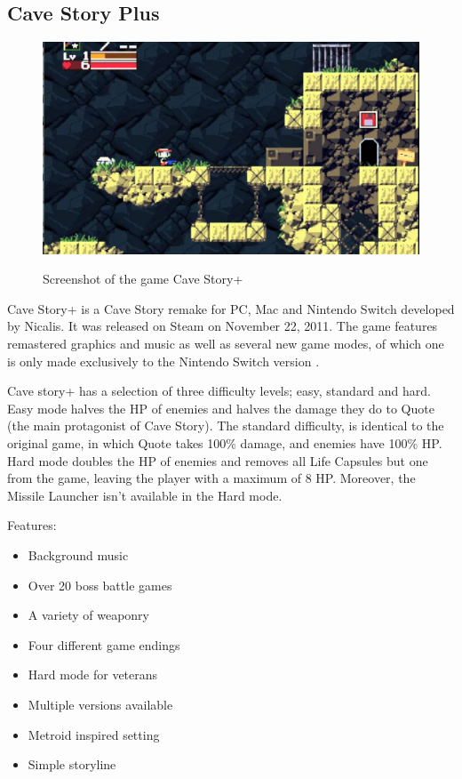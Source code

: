 \documentclass[12p]{article}
\begin{document}

\subsection{Cave Story Plus}

\begin{figure}[ht]
    \center
    \includegraphics[width=1\textwidth]{StateOfTheArtScreenshots/cave_story_plus}
    \label{StateOfTheArt_Screenshots_CaveStoryPlus}
    \caption{Screenshot of the game Cave Story+ \cite{CaveStoryPlusScreenshot}}
\end{figure}

Cave Story+ is a Cave Story remake for PC, Mac and Nintendo Switch developed by Nicalis. It was released on Steam on November 22, 2011. The game features remastered graphics and music as well as several new game modes, of which one is only made exclusively to the Nintendo Switch version \cite{CaveStoryPlusWiki}.

Cave story+ has a selection of three difficulty levels; easy, standard and hard. Easy mode halves the HP of enemies and halves the damage they do to Quote (the main protagonist of Cave Story). The standard difficulty, is identical to the original game, in which Quote takes 100\% damage, and enemies have 100\% HP. Hard mode doubles the HP of enemies and removes all Life Capsules but one from the game, leaving the player with a maximum of 8 HP. Moreover, the Missile Launcher isn't available in the Hard mode.

Features:

\begin{itemize}
    \item Background music
    \item Over 20 boss battle games
    \item A variety of weaponry
    \item Four different game endings
    \item Hard mode for veterans
    \item Multiple versions available
    \item Metroid inspired setting
    \item Simple storyline
\end{itemize}
\end{document}
